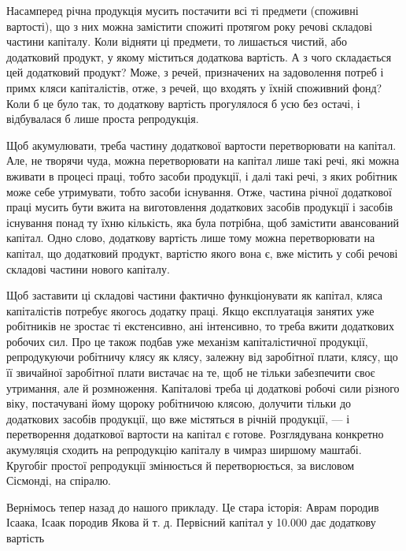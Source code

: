 Насамперед річна продукція мусить постачити всі ті предмети
(споживні вартості), що з них можна замістити спожиті
протягом року речові складові частини капіталу. Коли відняти
ці предмети, то лишається чистий, або додатковий продукт, у
якому міститься додаткова вартість. А з чого складається цей
додатковий продукт? Може, з речей, призначених на задоволення
потреб і примх кляси капіталістів, отже, з речей, що входять
у їхній споживний фонд? Коли б це було так, то додаткову
вартість прогулялося б усю без остачі, і відбувалася б лише
проста репродукція.

Щоб акумулювати, треба частину додаткової вартости перетворювати
на капітал. Але, не творячи чуда, можна перетворювати
на капітал лише такі речі, які можна вживати в процесі
праці, тобто засоби продукції, і далі такі речі, з яких робітник
може себе утримувати, тобто засоби існування. Отже, частина
річної додаткової праці мусить бути вжита на виготовлення додаткових
засобів продукції і засобів існування понад ту їхню
кількість, яка була потрібна, щоб замістити авансований капітал.
Одно слово, додаткову вартість лише тому можна перетворювати
на капітал, що додатковий продукт, вартістю якого вона
є, вже містить у собі речові складові частини нового капіталу.

Щоб заставити ці складові частини фактично функціонувати
як капітал, кляса капіталістів потребує якогось додатку праці.
Якщо експлуатація занятих уже робітників не зростає ті екстенсивно,
ані інтенсивно, то треба вжити додаткових робочих сил.
Про це також подбав уже механізм капіталістичної продукції,
репродукуючи робітничу клясу як клясу, залежну від заробітної
плати, клясу, що її звичайної заробітної плати вистачає на
те, щоб не тільки забезпечити своє утримання, але й розмноження.
Капіталові треба ці додаткові робочі сили різного віку, постачувані
йому щороку робітничою клясою, долучити тільки до
додаткових засобів продукції, що вже містяться в річній продукції,
— і перетворення додаткової вартости на капітал є готове.
Розглядувана конкретно акумуляція сходить на репродукцію
капіталу в чимраз ширшому маштабі. Кругобіг простої репродукції
змінюється й перетворюється, за висловом Сісмонді, на
спіралю.

Вернімось тепер назад до нашого прикладу. Це стара історія:
Аврам породив Ісаака, Ісаак породив Якова й т. д. Первісний
капітал у \num{10.000} дає додаткову вартість
\parbreak{}  %

